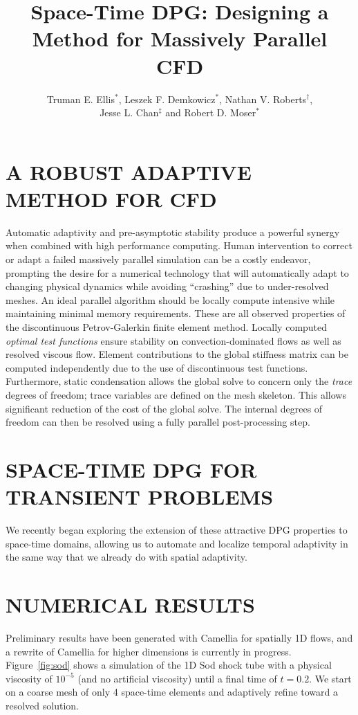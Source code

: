 \documentclass{parcfd2014}
\title{Space-Time DPG: Designing a Method for Massively Parallel CFD}
\author{Truman E. Ellis$^{*}$, Leszek F. Demkowicz$^{*}$, Nathan V. Roberts$^{\dag}$,\\ Jesse L. Chan$^{\ddag}$ and Robert D. Moser$^{*}$}
\begin{document}
\section{A ROBUST ADAPTIVE METHOD FOR CFD}

Automatic adaptivity and pre-asymptotic stability produce a powerful synergy when combined with high performance computing.
Human intervention to correct or adapt a failed massively parallel simulation can be a costly endeavor, prompting the desire for a
numerical technology that will automatically adapt to changing physical dynamics while avoiding ``crashing'' due to under-resolved meshes.
An ideal parallel algorithm should be locally compute intensive while maintaining minimal memory requirements.
These are all observed properties of the discontinuous Petrov-Galerkin finite element method.
Locally computed \emph{optimal test functions} ensure stability on convection-dominated flows as well as resolved viscous flow.
Element contributions to the global stiffness matrix can be computed independently due to the use of discontinuous test functions.
Furthermore, static condensation allows the global solve to concern only the \emph{trace} degrees of freedom; 
trace variables are defined on the mesh skeleton.  
This allows significant reduction of the cost of the global solve.  
The internal degrees of freedom can then be resolved using a fully parallel post-processing step.

\section{SPACE-TIME DPG FOR TRANSIENT PROBLEMS}
We recently began exploring the extension of these attractive DPG properties to space-time domains, allowing us to automate and localize temporal adaptivity
in the same way that we already do with spatial adaptivity. 

\section{NUMERICAL RESULTS}
Preliminary results have been generated with Camellia\cite{CamelliaDPG} for spatially 1D flows,
and a rewrite of Camellia for higher dimensions is currently in progress.
Figure~\ref{fig:sod} shows a simulation of the 1D Sod shock tube with a physical viscosity of $10^{-5}$ (and no artificial viscosity) 
until a final time of $t=0.2$.
We start on a coarse mesh of only 4 space-time elements and adaptively refine toward a resolved solution.
\end{document}
